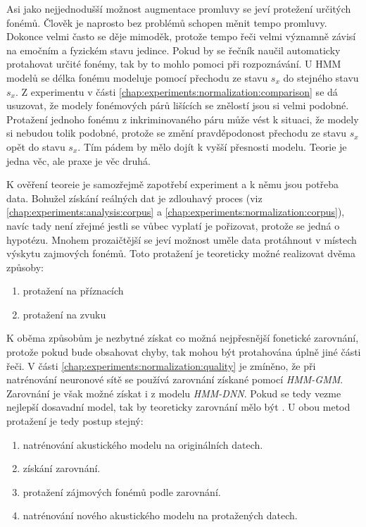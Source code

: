 Asi jako nejjednodušší možnost augmentace promluvy se jeví protežení určitých fonémů. Člověk je naprosto bez problémů schopen měnit tempo promluvy. Dokonce velmi často se děje mimoděk, protože tempo řeči velmi významně závisí na emočním a fyzickém stavu jedince. Pokud by se řečník naučil automaticky protahovat určité fonémy, tak by to mohlo pomoci při rozpoznávání. U HMM modelů se délka fonému modeluje pomocí přechodu ze stavu $s_x$ do stejného stavu $s_x$. Z  experimentu v části \ref{chap:experiments:normalization:comparison} se dá usuzovat, že modely fonémových párů lišících se znělostí jsou si velmi podobné. Protažení jednoho fonému z inkriminovaného páru může vést k situaci, že modely si nebudou tolik podobné, protože se změní pravděpodonost přechodu ze stavu $s_x$ opět do stavu $s_x$. Tím pádem by mělo dojít k vyšší přesnosti modelu. Teorie je jedna věc, ale praxe je věc druhá.

K ověření teoreie je samozřejmě zapotřebí experiment a k němu jsou potřeba data. Bohužel získání reálných dat je zdlouhavý proces (viz \ref{chap:experiments:analysis:corpus} a \ref{chap:experiments:normalization:corpus}), navíc tady není zřejmé jestli se vůbec vyplatí je pořizovat, protože se jedná o hypotézu. Mnohem prozaičtější se jeví možnost uměle data protáhnout v místech výskytu zajmových fonémů. Toto protažení je teoreticky možné realizovat dvěma způsoby:

\begin{enumerate}
  \item protažení na příznacích
  \item protažení na zvuku
\end{enumerate}

\noindent K oběma způsobům je nezbytné získat co možná nejpřesnější fonetické zarovnání, protože pokud bude obsahovat chyby, tak mohou být protahována úplně jiné části řeči. V části \ref{chap:experiments:normalization:quality} je zmíněno, že při natrénování neuronové sítě se používá zarovnání získané pomocí \textit{HMM-GMM}. Zarovnání je však možné získat i z modelu \textit{HMM-DNN}. Pokud se tedy vezme nejlepší dosavadní model, tak by teoreticky zarovnání mělo být . U obou metod protažení je tedy postup stejný:

\begin{enumerate}
  \item natrénování akustického modelu na originálních datech.
  \item získání zarovnání.
  \item protažení zájmových fonémů podle zarovnání.
  \item natrénování nového akustického modelu na protažených datech.
\end{enumerate}

